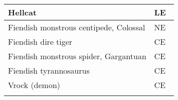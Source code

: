 \begin{longtable}{llll}
\hline
\multicolumn{1}{|p{3.326in}|}{\begin{minipage}[t]{3.326in}\raggedright
Hellcat\end{minipage}} & \multicolumn{3}{p{0.601in}|}{\begin{minipage}[t]{0.601in}\raggedright
LE\end{minipage}}\\
\hline
\multicolumn{1}{|p{3.326in}|}{\begin{minipage}[t]{3.326in}\raggedright
Fiendish monstrous centipede, Colossal\end{minipage}} & \multicolumn{3}{p{0.601in}|}{\begin{minipage}[t]{0.601in}\raggedright
NE\end{minipage}}\\
\hline
\multicolumn{1}{|p{3.326in}|}{\begin{minipage}[t]{3.326in}\raggedright
Fiendish dire tiger\end{minipage}} & \multicolumn{3}{p{0.601in}|}{\begin{minipage}[t]{0.601in}\raggedright
CE\end{minipage}}\\
\hline
\multicolumn{1}{|p{3.326in}|}{\begin{minipage}[t]{3.326in}\raggedright
Fiendish monstrous spider, Gargantuan\end{minipage}} & \multicolumn{3}{p{0.601in}|}{\begin{minipage}[t]{0.601in}\raggedright
CE\end{minipage}}\\
\hline
\multicolumn{1}{|p{3.326in}|}{\begin{minipage}[t]{3.326in}\raggedright
Fiendish tyrannosaurus\end{minipage}} & \multicolumn{3}{p{0.601in}|}{\begin{minipage}[t]{0.601in}\raggedright
CE\end{minipage}}\\
\hline
\multicolumn{1}{|p{3.326in}|}{\begin{minipage}[t]{3.326in}\raggedright
Vrock (demon)\end{minipage}} & \multicolumn{3}{p{0.601in}|}{\begin{minipage}[t]{0.601in}\raggedright
CE\end{minipage}}\\
\hline
\multicolumn{1}{|p{3.326in}|}{\begin{minipage}[t]{3.326in}\raggedright

\end{minipage}}
\end{longtable}
